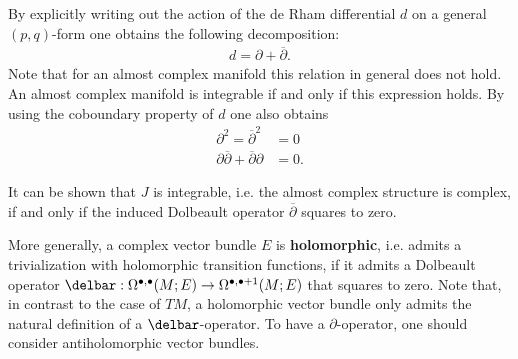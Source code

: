     \begin{property}
        By explicitly writing out the action of the de Rham differential $d$ on a general $(p,q)$-form one obtains the following decomposition:
        \begin{gather}
            d = \partial + \overline{\partial}.
        \end{gather}
        Note that for an almost complex manifold this relation in general does not hold. An almost complex manifold is integrable if and only if this expression holds. By using the coboundary property of $d$ one also obtains
        \begin{align}
            \partial^2 = \overline{\partial}^2 &= 0\\
            \partial\overline{\partial} + \overline{\partial}\partial &= 0.
        \end{align}
    \end{property}
    \begin{remark}[Integrability]
        It can be shown that $J$ is integrable, i.e. the almost complex structure is complex, if and only if the induced Dolbeault operator $\overline{\partial}$ squares to zero.

        More generally, a complex vector bundle $E$ is \textbf{holomorphic}, i.e. admits a trivialization with holomorphic transition functions, if it admits a Dolbeault operator $\delbar:\Omega^{\bullet,\bullet}(M;E)\rightarrow\Omega^{\bullet,\bullet+1}(M;E)$ that squares to zero. Note that, in contrast to the case of $TM$, a holomorphic vector bundle only admits the natural definition of a $\delbar$-operator. To have a $\partial$-operator, one should consider antiholomorphic vector bundles.
    \end{remark}

